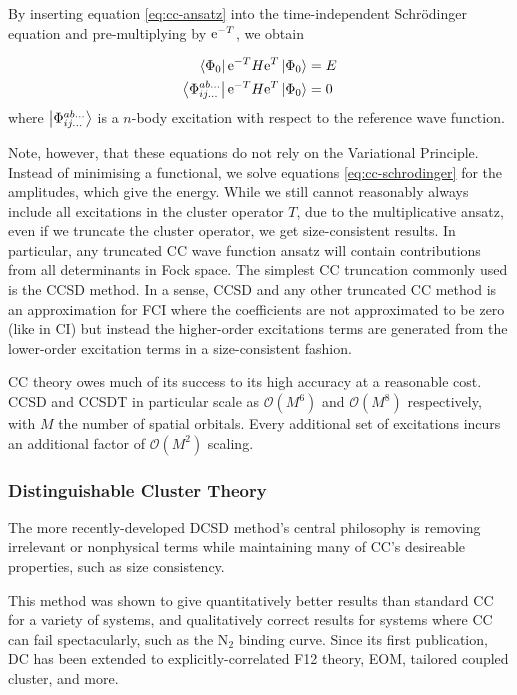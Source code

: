 By inserting equation \ref{eq:cc-ansatz} into the time-independent Schr\"odinger equation and pre-multiplying by $\mathrm{e}^{-T}$, we obtain

\begin{align}
    \bra{\Phi_0}\mathrm{e}^{-T} H \mathrm{e}^T\ket{\Phi_0} &= E \\
    \label{eq:cc-schrodinger}
    \bra{\Phi_{ij...}^{ab...}}\mathrm{e}^{-T} H \mathrm{e}^T\ket{\Phi_0} &= 0
\end{align}
where $\ket{\Phi_{ij...}^{ab...}}$ is a $n$-body excitation with respect to the reference wave function.

Note, however, that these equations do not rely on the Variational Principle. Instead of minimising a functional, we solve equations \ref{eq:cc-schrodinger} for the amplitudes, which give the energy. While we still cannot reasonably always include all excitations in the cluster operator $T$, due to the multiplicative ansatz, even if we truncate the cluster operator, we get size-consistent results. In particular, any truncated CC wave function ansatz will contain contributions from all determinants in Fock space. The simplest CC truncation commonly used is the \gls{CCSD} method. In a sense, \gls{CCSD} and any other truncated CC method is an approximation for \gls{FCI} where the coefficients are not approximated to be zero (like in \gls{CI}) but instead the higher-order excitations terms are generated from the lower-order excitation terms in a size-consistent fashion.

CC theory owes much of its success to its high accuracy at a reasonable cost. \gls{CCSD} and \gls{CCSDT} in particular scale as $\mathcal{O}(M^6)$ and $\mathcal{O}(M^8)$ respectively, with $M$ the number of spatial orbitals. Every additional set of excitations incurs an additional factor of $\mathcal{O}(M^2)$ scaling.

\subsubsection{Distinguishable Cluster Theory}

The more recently-developed \gls{DCSD} method's central philosophy is removing irrelevant or nonphysical terms while maintaining many of CC's desireable properties, such as size consistency.\cite{katsCommunication2013}

This method was shown to give quantitatively better results than standard CC for a variety of systems, and qualitatively correct results for systems where CC can fail spectacularly, such as the N$_2$ binding curve. Since its first publication, \gls{DC} has been extended to explicitly-correlated F12 theory,\cite{katsAccurate2015} \gls{EOM},\cite{rishiExcited2017} tailored coupled cluster,\cite{vitaleFCIQMCTailored2020} and more.


